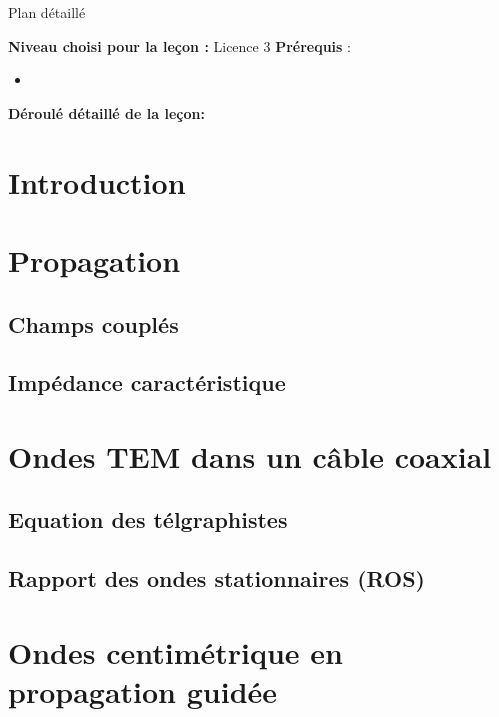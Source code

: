 \begin{reportBlock}{Plan détaillé}

  \textbf{Niveau choisi pour la leçon :} Licence 3
  \newline
  \textbf{Prérequis} : \begin{itemize}
      \item 
  \end{itemize}

  \textbf{Déroulé détaillé de la leçon: }  
  
  \section*{Introduction}

  \section{Propagation}
  \subsection{Champs couplés}
  \subsection{Impédance caractéristique}

  
  \section{Ondes TEM dans un câble coaxial}

  \subsection{Equation des télgraphistes}

  \subsection{Rapport des ondes stationnaires (ROS)}

  \section{Ondes centimétrique en propagation guidée}
  
  

\end{reportBlock}